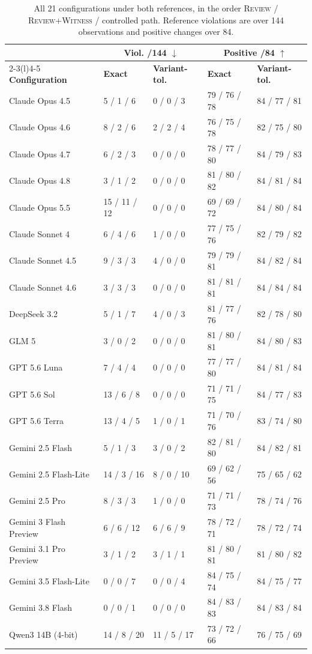 \documentclass[acmsmall,review]{acmart}
\newcommand{\witness}{\textsc{Witness}}
\newcommand{\review}{\textsc{Review}}
\begin{document}
\begin{table}[H]
\centering
\caption{All 21 configurations under both references, in the order \review{} / \review{}+\witness{} / controlled path. Reference violations are over 144 observations and positive changes over 84.}\label{tab:K3}
\small
\setlength{\tabcolsep}{3pt}
\begin{tabular}{@{}lllll@{}}
\toprule
 & \multicolumn{2}{c}{\textbf{Viol. /144 $\downarrow$}} & \multicolumn{2}{c}{\textbf{Positive /84 $\uparrow$}} \\
\cmidrule(lr){2-3}\cmidrule(l){4-5}
\textbf{Configuration} & \textbf{Exact} & \textbf{Variant-tol.} & \textbf{Exact} & \textbf{Variant-tol.} \\
\midrule
Claude Opus 4.5 & 5 / 1 / 6 & 0 / 0 / 3 & 79 / 76 / 78 & 84 / 77 / 81 \\
Claude Opus 4.6 & 8 / 2 / 6 & 2 / 2 / 4 & 76 / 75 / 78 & 82 / 75 / 80 \\
Claude Opus 4.7 & 6 / 2 / 3 & 0 / 0 / 0 & 78 / 77 / 80 & 84 / 79 / 83 \\
Claude Opus 4.8 & 3 / 1 / 2 & 0 / 0 / 0 & 81 / 80 / 82 & 84 / 81 / 84 \\
Claude Opus 5.5 & 15 / 11 / 12 & 0 / 0 / 0 & 69 / 69 / 72 & 84 / 80 / 84 \\
Claude Sonnet 4 & 6 / 4 / 6 & 1 / 0 / 0 & 77 / 75 / 76 & 82 / 79 / 82 \\
Claude Sonnet 4.5 & 9 / 3 / 3 & 4 / 0 / 0 & 79 / 79 / 81 & 84 / 82 / 84 \\
Claude Sonnet 4.6 & 3 / 3 / 3 & 0 / 0 / 0 & 81 / 81 / 81 & 84 / 84 / 84 \\
DeepSeek 3.2 & 5 / 1 / 7 & 4 / 0 / 3 & 81 / 77 / 76 & 82 / 78 / 80 \\
GLM 5 & 3 / 0 / 2 & 0 / 0 / 0 & 81 / 80 / 81 & 84 / 80 / 83 \\
GPT 5.6 Luna & 7 / 4 / 4 & 0 / 0 / 0 & 77 / 77 / 80 & 84 / 81 / 84 \\
GPT 5.6 Sol & 13 / 6 / 8 & 0 / 0 / 0 & 71 / 71 / 75 & 84 / 77 / 83 \\
GPT 5.6 Terra & 13 / 4 / 5 & 1 / 0 / 1 & 71 / 70 / 76 & 83 / 74 / 80 \\
Gemini 2.5 Flash & 5 / 1 / 3 & 3 / 0 / 2 & 82 / 81 / 80 & 84 / 82 / 81 \\
Gemini 2.5 Flash-Lite & 14 / 3 / 16 & 8 / 0 / 10 & 69 / 62 / 56 & 75 / 65 / 62 \\
Gemini 2.5 Pro & 8 / 3 / 3 & 1 / 0 / 0 & 71 / 71 / 73 & 78 / 74 / 76 \\
Gemini 3 Flash Preview & 6 / 6 / 12 & 6 / 6 / 9 & 78 / 72 / 71 & 78 / 72 / 74 \\
Gemini 3.1 Pro Preview & 3 / 1 / 2 & 3 / 1 / 1 & 81 / 80 / 81 & 81 / 80 / 82 \\
Gemini 3.5 Flash-Lite & 0 / 0 / 7 & 0 / 0 / 4 & 84 / 75 / 74 & 84 / 75 / 77 \\
Gemini 3.8 Flash & 0 / 0 / 1 & 0 / 0 / 0 & 84 / 83 / 83 & 84 / 83 / 84 \\
Qwen3 14B (4-bit) & 14 / 8 / 20 & 11 / 5 / 17 & 73 / 72 / 66 & 76 / 75 / 69 \\
\bottomrule
\end{tabular}
\end{table}
\end{document}

